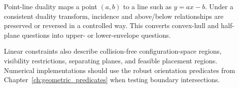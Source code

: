 Point-line duality maps a point $(a,b)$ to a line such as $y=ax-b$. Under a
consistent duality transform, incidence and above/below relationships are
preserved or reversed in a controlled way. This converts convex-hull and
half-plane questions into upper- or lower-envelope questions.

Linear constraints also describe collision-free configuration-space regions,
visibility restrictions, separating planes, and feasible placement regions.
Numerical implementations should use the robust orientation predicates from
Chapter~\ref{ch:geometric_predicates} when testing boundary intersections.

